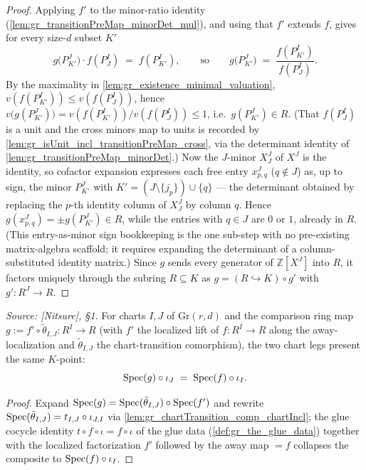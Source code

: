 \begin{proof}
    \leanok
  Applying \(f'\) to the minor-ratio identity
  (\cref{lem:gr_transitionPreMap_minorDet_mul}), and using that \(f'\) extends
  \(f\), gives for every size-\(d\) subset \(K'\)
  \[
    g\bigl(P^J_{K'}\bigr)\cdot f(P^I_J) \;=\; f(P^I_{K'}),
    \qquad\text{so}\qquad
    g\bigl(P^J_{K'}\bigr) \;=\; \frac{f(P^I_{K'})}{f(P^I_J)} .
  \]
  By the maximality in \cref{lem:gr_existence_minimal_valuation},
  \(v(f(P^I_{K'})) \le v(f(P^I_J))\), hence \(v\bigl(g(P^J_{K'})\bigr) =
  v(f(P^I_{K'}))/v(f(P^I_J)) \le 1\), i.e.\ \(g(P^J_{K'}) \in R\). (That
  \(f(P^I_J)\) is a unit and the cross minors map to units is recorded by
  \cref{lem:gr_isUnit_incl_transitionPreMap_cross}, via the determinant identity of
  \cref{lem:gr_transitionPreMap_minorDet}.) Now the \(J\)-minor \(X^J_J\) of \(X^J\)
  is the identity, so cofactor expansion expresses each free entry \(x^J_{p,q}\)
  (\(q \notin J\)) as, up to sign, the minor \(P^J_{K'}\) with \(K' = (J \setminus
  \{j_p\}) \cup \{q\}\) --- the determinant obtained by replacing the \(p\)-th
  identity column of \(X^J_J\) by column \(q\). Hence \(g(x^J_{p,q}) = \pm
  g(P^J_{K'}) \in R\), while the entries with \(q \in J\) are \(0\) or \(1\),
  already in \(R\). (This entry-as-minor sign bookkeeping is the one sub-step with
  no pre-existing matrix-algebra scaffold; it requires expanding the determinant of
  a column-substituted identity matrix.) Since \(g\) sends every generator of
  \(\mathbb{Z}[X^J]\) into \(R\), it factors uniquely through the subring \(R
  \subseteq K\) as \(g = (R \hookrightarrow K) \circ g'\) with \(g' : R^J \to R\).
\end{proof}


\begin{lemma}\leanok
  \label{lem:gr_existence_chart_kpoint_eq}
  \textit{Source: [Nitsure], \S 1.}
  For charts \(I, J\) of \(\mathrm{Gr}(r,d)\) and the comparison ring map
  \(g := f' \circ \tilde\theta_{I,J} : R^I \to R\) (with \(f'\) the localized lift of
  \(f : R^I \to R\) along the away-localization and \(\tilde\theta_{I,J}\) the chart-transition
  comorphism), the two chart legs present the same \(K\)-point:
  \[
    \operatorname{Spec}(g) \circ \iota_J \;=\; \operatorname{Spec}(f) \circ \iota_I .
  \]
\end{lemma}
\begin{proof}
  \leanok
  Expand \(\operatorname{Spec}(g) = \operatorname{Spec}(\tilde\theta_{I,J}) \circ \operatorname{Spec}(f')\) and rewrite
  \(\operatorname{Spec}(\tilde\theta_{I,J}) = t_{I,J} \circ \iota_{J,I}\) via
  \cref{lem:gr_chartTransition_comp_chartIncl}; the glue cocycle identity
  \(t \circ f \circ \iota = f \circ \iota\) of the glue data (\cref{def:gr_the_glue_data}) together with
  the localized factorization \(f' \) followed by the away map \(= f\) collapses the composite to
  \(\operatorname{Spec}(f) \circ \iota_I\).
\end{proof}

